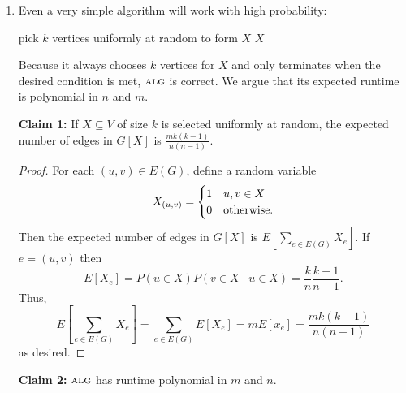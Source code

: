 \documentclass[11pt]{article}
\newcommand{\alg}{\textsc{alg}}
\begin{document}
	\begin{enumerate}[(1)]
		\item Even a very simple algorithm will work with high probability:
		
		\begin{algorithm}
			\begin{algorithmic}
				\Loop
				\State pick $k$ vertices uniformly at random to form $X$
				\State \Return $X$
				\EndIf
				\EndLoop
				\EndFunction
			\end{algorithmic}
		\end{algorithm}
		
		Because it always chooses $k$ vertices for $X$ and only terminates when the desired condition is met, $\alg$ is correct.
		We argue that its expected runtime is polynomial in $n$ and $m$.
		
		{\bf Claim 1:} If $X \subseteq V$ of size $k$ is selected uniformly at random, the expected number of edges in $G[X]$ is $\frac{mk(k-1)}{n(n-1)}$.
		
		\begin{proof}
			For each $(u,v) \in E(G)$, define a random variable \[X_{(u,v)} = \begin{cases}1 & u, v \in X\\ 0 & \textnormal{otherwise}.\end{cases}\]
			Then the expected number of edges in $G[X]$ is $E\left[\sum_{e \in E(G)}X_e\right]$.
			If $e = (u,v)$ then \[E[X_e] = P(u \in X) P(v \in X \mid u \in X) = \frac{k}{n}\frac{k-1}{n-1}.\]
			Thus, \[E\left[\sum_{e \in E(G)}X_e\right] = \sum_{e \in E(G)} E[X_e] = mE[x_e] = \frac{mk(k-1)}{n(n-1)}\] as desired.
		\end{proof}
		
		{\bf Claim 2:} $\alg$ has runtime polynomial in $m$ and $n$.
		

\end{enumerate}
\end{document}
